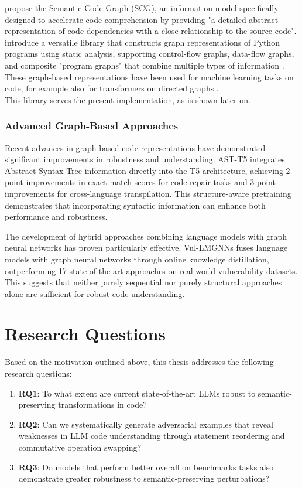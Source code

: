 \documentclass[%
thesis=student,%
coverpage=false,%
titlepage=false,%
headmarks=true, %
english,%
font=libertine, %
math=newpxtx, %
BCOR=5mm,%
coverBCOR=11mm%
]{tum-templates/book/tumbook}
\begin{document}
\textcite{Borowski2023} propose the Semantic Code Graph (SCG), an information model specifically designed to accelerate code comprehension by providing "a detailed abstract representation of code dependencies with a close relationship to the source code". \\

\textcite{Bieber2022} introduce a versatile library that constructs graph representations of Python programs using static analysis, supporting control-flow graphs, data-flow graphs, and composite "program graphs" that combine multiple types of information \cite{Bieber2022}. These graph-based representations have been used for machine learning tasks on code, for example also for transformers on directed graphs \cite{Geisler2023}. \\
This library serves the present implementation, as is shown later on.

\subsubsection{Advanced Graph-Based Approaches}

Recent advances in graph-based code representations have demonstrated significant improvements in robustness and understanding. AST-T5 \cite{Gong2024_2} integrates Abstract Syntax Tree information directly into the T5 architecture, achieving 2-point improvements in exact match scores for code repair tasks and 3-point improvements for cross-language transpilation. This structure-aware pretraining demonstrates that incorporating syntactic information can enhance both performance and robustness.

The development of hybrid approaches combining language models with graph neural networks has proven particularly effective. Vul-LMGNNs \cite{Liu2025} fuses language models with graph neural networks through online knowledge distillation, outperforming 17 state-of-the-art approaches on real-world vulnerability datasets. This suggests that neither purely sequential nor purely structural approaches alone are sufficient for robust code understanding.

\section{Research Questions}
Based on the motivation outlined above, this thesis addresses the following research questions:

\begin{enumerate}
    \item \textbf{RQ1}: To what extent are current state-of-the-art LLMs robust to semantic-preserving transformations in code?
    \item \textbf{RQ2}: Can we systematically generate adversarial examples that reveal weaknesses in LLM code understanding through statement reordering and commutative operation swapping?
    \item \textbf{RQ3}: Do models that perform better overall on benchmarks tasks also demonstrate greater robustness to semantic-preserving perturbations?
\end{enumerate}
\end{document}
